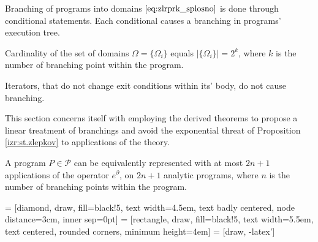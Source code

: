 \documentclass[11pt]{article}
\newcommand{\dP}{\mathcal{P}}
\newcommand{\D}{\partial}
\begin{document}
Branching of programs into domains $\eqref{eq:zlrprk_splosno}$ is done through conditional statements. Each conditional causes a branching in programs' execution tree.

\begin{proposition}\label{izr:st.zlepkov}
Cardinality of the set of domains $\Omega=\{\Omega_i\}$ equals $\lvert\{\Omega_i
\}\rvert=2^k$, where $k$ is the number of branching point within the program.
\end{proposition}
\begin{remark}
Iterators, that do not change exit conditions within its' body, do not cause branching.
\end{remark}

This section concerns itself with employing the derived theorems to propose a linear treatment of branchings and avoid the exponential threat of Proposition \ref{izr:st.zlepkov} to applications of the theory.

\begin{theorem}\label{izr:2n+1}
A program $P\in\dP$ can be equivalently represented with at most $2n+1$
applications of the operator $e^\D$, on $2n+1$ analytic programs, where
$n$ is the number of branching points within the program.
\end{theorem}




 = [diamond, draw, fill=black!5, 
    text width=4.5em, text badly centered, node distance=3cm, inner sep=0pt]
 = [rectangle, draw, fill=black!5, 
    text width=5.5em, text centered, rounded corners, minimum height=4em]
 = [draw, -latex']
\end{document}
